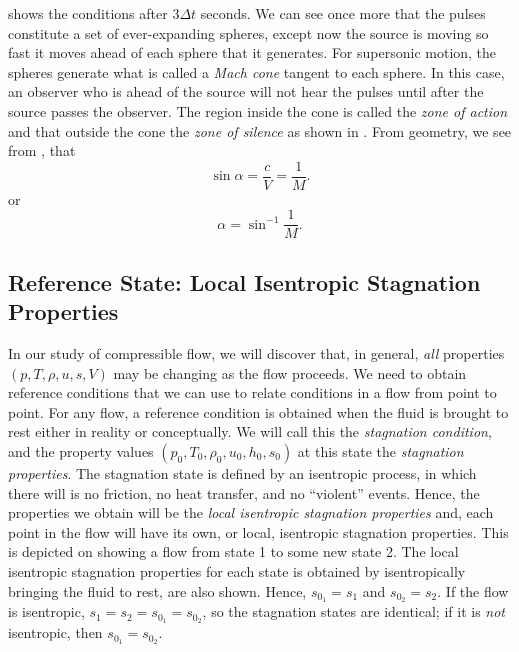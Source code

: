 \begin{enumerate}
     shows the conditions after $3 \Delta t$ seconds.
    We can see once more that the pulses constitute a set of ever-expanding spheres, except now the source is moving so fast it moves ahead of each sphere that it generates.
    For supersonic motion, the spheres generate what is called a \textit{Mach cone} tangent to each sphere.
    In this case, an observer who is ahead of the source will not hear the pulses until after the source passes the observer.
    The region inside the cone is called the \textit{zone of action} and that outside the cone the \textit{zone of silence} as shown in .
    From geometry, we see from , that
    \begin{equation*}
      \sin \alpha = \frac{c}{V} = \frac{1}{M}
    .\end{equation*}
    or
    \begin{equation}
      \alpha = \sin^{-1} \frac{1}{M}
    .\end{equation}
\end{enumerate}

\subsection{Reference State: Local Isentropic Stagnation Properties}
In our study of compressible flow, we will discover that, in general, \textit{all} properties $(p, T, \rho, u, s, V)$ may be changing as the flow proceeds.
We need to obtain reference conditions that we can use to relate conditions in a flow from point to point.
For any flow, a reference condition is obtained when the fluid is brought to rest either in reality or conceptually.
We will call this the \textit{stagnation condition}, and the property values $(p_0, T_0, \rho_0, u_0, h_0, s_0)$ at this state the \textit{stagnation properties}.
The stagnation state is defined by an isentropic process, in which there will is no friction, no heat transfer, and no ``violent'' events.
Hence, the properties we obtain will be the \textit{local isentropic stagnation properties} and, each point in the flow will have its own, or local, isentropic stagnation properties.
This is depicted on  showing a flow from state 1 to some new state 2.
The local isentropic stagnation properties for each state is obtained by isentropically bringing the fluid to rest, are also shown.
Hence, $s_{0_1} = s_1$ and $s_{0_2} = s_2$.
If the flow is isentropic, $s_1 = s_2 = s_{0_1} = s_{0_2}$, so the stagnation states are identical; if it is \textit{not} isentropic, then $s_{0_1} = s_{0_2}$.

